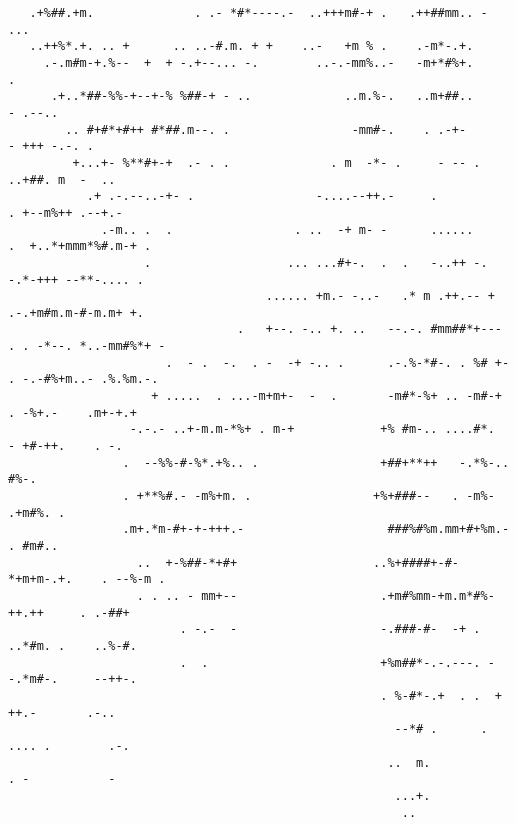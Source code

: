\documentclass[11pt]{article}
\begin{document}
\begin{verbatim}
   .+%##.+m.              . .- *#*----.-  ..+++m#-+ .   .++##mm.. - ...
   ..++%*.+. .. +      .. ..-#.m. + +    ..-   +m % .    .-m*-.+.
     .-.m#m-+.%--  +  + -.+--... -.        ..-.-mm%..-   -m+*#%+.          .
      .+..*##-%%-+--+-% %##-+ - ..             ..m.%-.   ..m+##..        - .--..
        .. #+#*+#++ #*##.m--. .                 -mm#-.    . .-+-        - +++ -.-. .
         +...+- %**#+-+  .- . .              . m  -*- .     - -- .      ..+##. m  -  ..
           .+ .-.--..-+- .                 -....--++.-     .           . +--m%++ .--+.-
             .-m.. .  .                 . ..  -+ m- -      ......     .  +..*+mmm*%#.m-+ .
                   .                   ... ...#+-.  .  .   -..++ -.       -.*-+++ --**-.... .
                                    ...... +m.- -..-   .* m .++.-- +     .-.+m#m.m-#-m.m+ +.
                                .   +--. -.. +. ..   --.-. #mm##*+---    . . -*--. *..-mm#%*+ -
                      .  - .  -.  . -  -+ -.. .      .-.%-*#-. . %# +-     . -.-#%+m..- .%.%m.-.
                    + .....  . ...-m+m+-  -  .       -m#*-%+ .. -m#-+        . -%+.-    .m+-+.+
                 -.-.- ..+-m.m-*%+ . m-+            +% #m-.. ....#*.         - +#-++.    . -.
                .  --%%-#-%*.+%.. .                 +##+**++   -.*%-..          #%-.
                . +**%#.- -m%+m. .                 +%+###--   . -m%-          .+m#%. .
                .m+.*m-#+-+-+++.-                    ###%#%m.mm+#+%m.-        . #m#..
                  ..  +-%##-*+#+                   ..%+####+-#- *+m+m-.+.    . --%-m .
                  . . .. - mm+--                    .+m#%mm-+m.m*#%-++.++     . .-##+
                        . -.-  -                    -.###-#-  -+ . ..*#m. .    ..%-#.
                        .  .                        +%m##*-.-.---. --.*m#-.     --++-.
                                                    . %-#*-.+  . .  + ++.-       .-..
                                                      --*# .      . .... .        .-.
                                                     ..  m.           . -           -
                                                      ...+.
                                                       ..
\end{verbatim}
\end{document}
